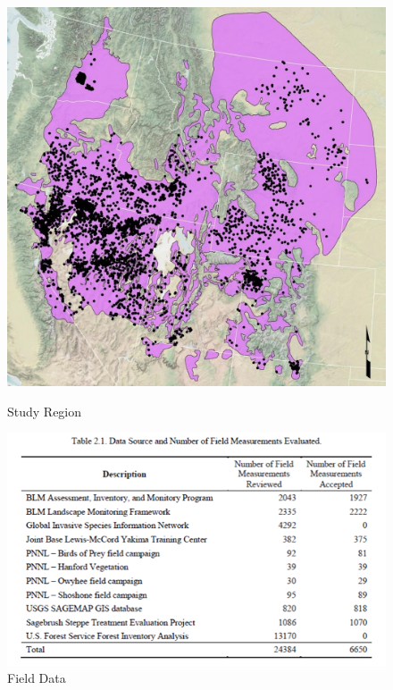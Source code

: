 \documentclass{article} %
\begin{document}
\begin{figure}
\centering
\begin{minipage}{.5\textwidth}
  \centering
  \includegraphics[width=\textwidth]{pics/studyarea.png}
 \caption{Study Region}\label{fig:studyarea}
\end{minipage}%
\begin{minipage}{.5\textwidth}
  \centering
  \includegraphics[width=\textwidth]{pics/fielddata.png}
\caption{Field Data}\label{fig:field}
\end{minipage}
\end{figure}
\end{document}
